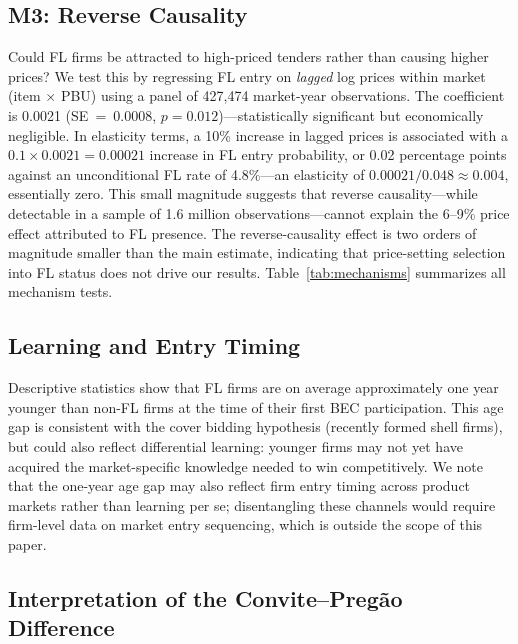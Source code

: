 \subsection{M3: Reverse Causality}

Could FL firms be attracted to high-priced tenders rather than causing
higher prices? We test this by regressing FL entry on \emph{lagged} log
prices within market (item $\times$ PBU) using a panel of 427,474
market-year observations. The coefficient is 0.0021 (SE~=~0.0008,
$p = 0.012$)---statistically significant but economically negligible.
In elasticity terms, a 10\% increase in lagged prices is associated with
a $0.1 \times 0.0021 = 0.00021$ increase in FL entry probability, or
0.02 percentage points against an unconditional FL rate of 4.8\%---an
elasticity of $0.00021 / 0.048 \approx 0.004$, essentially zero. This
small magnitude suggests that reverse causality---while detectable in a
sample of 1.6 million observations---cannot explain the 6--9\% price
effect attributed to FL presence. The reverse-causality effect is two
orders of magnitude smaller than the main estimate, indicating that
price-setting selection into FL status does not drive our results.
Table~\ref{tab:mechanisms} summarizes all mechanism tests.



\subsection{Learning and Entry Timing}

Descriptive statistics show that FL firms are on average approximately %
one year younger than non-FL firms at the time of their first BEC
participation. This age gap is consistent with the cover bidding
hypothesis (recently formed shell firms), but could also reflect
differential learning: younger firms may not yet have acquired the
market-specific knowledge needed to win competitively. We note that the
one-year age gap may also reflect firm entry timing across product markets
rather than learning per se; disentangling these channels would require
firm-level data on market entry sequencing, which is outside the scope of
this paper.

\subsection{Interpretation of the Convite--Preg\~ao Difference}

